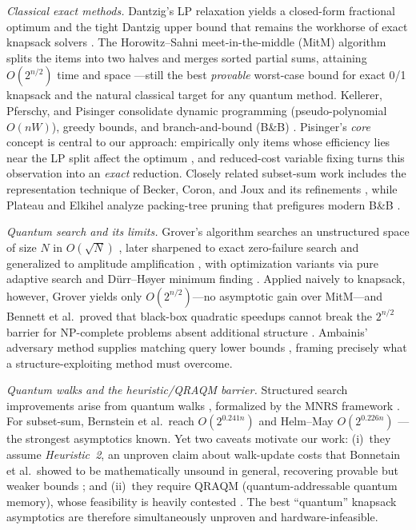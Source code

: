 \documentclass[conference]{IEEEtran} \IEEEoverridecommandlockouts
\begin{document}
\textit{Classical exact methods.} Dantzig's LP relaxation yields a closed-form fractional optimum and the tight Dantzig upper bound that remains the workhorse of exact knapsack solvers \cite{ref1}. The Horowitz--Sahni meet-in-the-middle (MitM) algorithm splits the items into two halves and merges sorted partial sums, attaining $O(2^{n/2})$ time and space \cite{ref2}---still the best \emph{provable} worst-case bound for exact 0/1 knapsack and the natural classical target for any quantum method. Kellerer, Pferschy, and Pisinger consolidate dynamic programming (pseudo-polynomial $O(nW)$), greedy bounds, and branch-and-bound (B\&B) \cite{ref3}. Pisinger's \emph{core} concept is central to our approach: empirically only items whose efficiency lies near the LP split affect the optimum \cite{ref4}, and reduced-cost variable fixing turns this observation into an \emph{exact} reduction. Closely related subset-sum work includes the representation technique of Becker, Coron, and Joux \cite{ref5} and its refinements \cite{ref6}, while Plateau and Elkihel analyze packing-tree pruning that prefigures modern B\&B \cite{ref7}.

\textit{Quantum search and its limits.} Grover's algorithm searches an unstructured space of size $N$ in $O(\sqrt{N})$ \cite{ref8}, later sharpened to exact zero-failure search \cite{ref10} and generalized to amplitude amplification \cite{ref11}, with optimization variants via pure adaptive search \cite{ref12} and D\"urr--H{\o}yer minimum finding \cite{ref13}. Applied naively to knapsack, however, Grover yields only $O(2^{n/2})$---no asymptotic gain over MitM---and Bennett et al.\ proved that black-box quadratic speedups cannot break the $2^{n/2}$ barrier for NP-complete problems absent additional structure \cite{ref9}. Ambainis' adversary method supplies matching query lower bounds \cite{ref34}, framing precisely what a structure-exploiting method must overcome.

\textit{Quantum walks and the heuristic/QRAQM barrier.} Structured search improvements arise from quantum walks \cite{ref14}, formalized by the MNRS framework \cite{ref15}. For subset-sum, Bernstein et al.\ reach $O(2^{0.241n})$ \cite{ref16} and Helm--May $O(2^{0.226n})$ \cite{ref17}---the strongest asymptotics known. Yet two caveats motivate our work: (i)~they assume \emph{Heuristic~2}, an unproven claim about walk-update costs that Bonnetain et al.\ showed to be mathematically unsound in general, recovering provable but weaker bounds \cite{bonnetain2020improved}; and (ii)~they require QRAQM (quantum-addressable quantum memory), whose feasibility is heavily contested \cite{ref18,ref19}. The best ``quantum'' knapsack asymptotics are therefore simultaneously unproven and hardware-infeasible.
\end{document}
